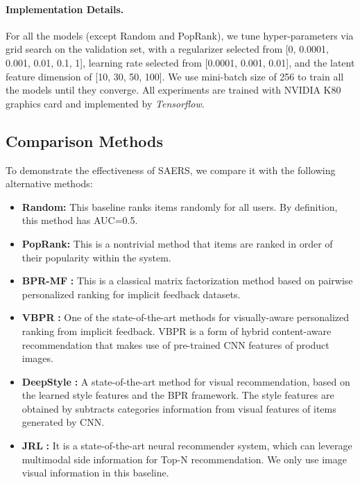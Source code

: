\documentclass{article}
\begin{document}
\paragraph{Implementation Details.}  For all the models (except Random and PopRank), we tune hyper-parameters via grid search on the validation set, with a regularizer selected from [0, 0.0001, 0.001, 0.01, 0.1, 1], learning rate selected from [0.0001, 0.001, 0.01], and the latent feature dimension of [10, 30, 50, 100]. We use mini-batch size of 256 to train all the models until they converge. All experiments are trained with NVIDIA K80 graphics card and implemented by \textit{Tensorflow}. 


\subsection{Comparison Methods}
To demonstrate the effectiveness of SAERS, we compare it with the following alternative methods:
\begin{itemize}[leftmargin=*,itemsep=2.5pt]
		\setlength{\itemsep}{0pt}
	\setlength{\parsep}{0pt}
	\setlength{\parskip}{0pt}
  \item \textbf{Random:} This baseline ranks items randomly for all users. By definition, this method has AUC=0.5.
  \item \textbf{PopRank:} This is a nontrivial method that items are ranked in order of their popularity within the system.
  \item \textbf{BPR-MF} \cite{rendle2009bpr}\textbf{:} This is a classical matrix factorization method based on  pairwise personalized ranking for implicit feedback datasets.
  \item \textbf{VBPR} \cite{he2016vbpr}\textbf{:} One of the state-of-the-art methods for visually-aware personalized ranking from implicit feedback. VBPR is a form of hybrid content-aware recommendation that makes use of pre-trained CNN features of product images.
  \item \textbf{DeepStyle} \cite{liu2017deepstyle}\textbf{:} A state-of-the-art method for visual recommendation, based on the learned style features and the BPR framework. The style features are obtained by subtracts categories information from visual features of items generated by CNN.
  \item \textbf{JRL} \cite{zhang2017joint}\textbf{:} It is a state-of-the-art neural recommender system, which can leverage multimodal side information for Top-N recommendation. We only use image visual information in this baseline.
\end{itemize}
\end{document}

